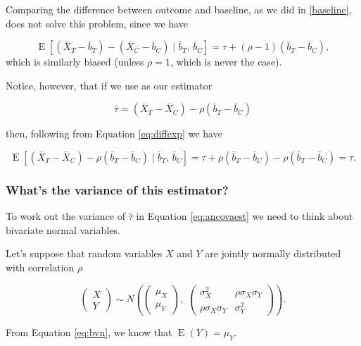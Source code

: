 \documentclass[
  openany]{book}
\theoremstyle{definition}
\theoremstyle{definition}
\theoremstyle{definition}
\theoremstyle{definition}
\theoremstyle{remark}
\begin{document}
Comparing the difference between outcome and baseline, as we did in \ref{baseline}, does not solve this problem, since we have

\[\operatorname{E}\left[\left(\bar{X}_T - \bar{b}_T\right) - \left(\bar{X}_C - \bar{b}_C\right)\mid{\bar{b}_T,\,\bar{b}_C}\right] = \tau + \left(\rho-1\right)\left(\bar{b}_T - \bar{b}_C\right),\]
which is similarly biased (unless \(\rho=1\), which is never the case).

Notice, however, that if we use as our estimator

\begin{equation}
\hat{\tau} = \left(\bar{X}_T - \bar{X}_C\right) - \rho \left(\bar{b}_T - \bar{b}_C\right)
\label{eq:ancovaest}
\end{equation}

then, following from Equation \eqref{eq:diffexp} we have

\[
\operatorname{E}\left[\left(\bar{X}_T - \bar{X}_C\right) - \rho \left(\bar{b}_T - \bar{b}_C\right)\mid{\bar{b}_T,\,\bar{b}_C}\right] = \tau + \rho\left(\bar{b}_T - \bar{b}_C\right)- \rho\left(\bar{b}_T - \bar{b}_C\right) = \tau. \]

\hypertarget{ancova-var}{%
\subsubsection{What's the variance of this estimator?}\label{ancova-var}}

To work out the variance of \(\hat{\tau}\) in Equation \eqref{eq:ancovaest} we need to think about bivariate normal variables.

Let's suppose that random variables \(X\) and \(Y\) are jointly normally distributed with correlation \(\rho\)

\begin{equation}
\begin{pmatrix}
X\\
Y
\end{pmatrix} \sim N\left(
\begin{pmatrix}
\mu_X\\
\mu_Y
\end{pmatrix},\;
\begin{pmatrix}
\sigma^2_X & \rho\sigma_X\sigma_Y \\
\rho\sigma_X\sigma_Y & \sigma^2_Y
\end{pmatrix}
\right).
\label{eq:bvn}
\end{equation}

From Equation \eqref{eq:bvn}, we know that \(\operatorname{E}\left(Y\right) = \mu_Y\).
\end{document}
